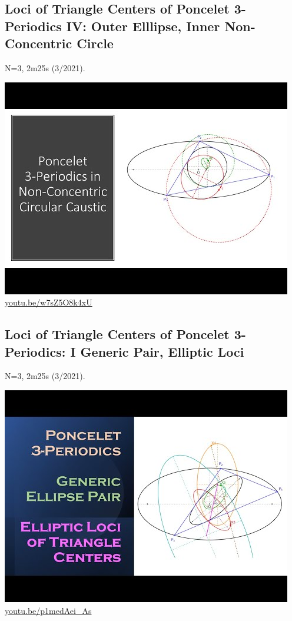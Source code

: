 \documentclass[12pt]{amsart}
\begin{document}
\subsection{Loci of Triangle Centers of Poncelet 3-Periodics IV: Outer Elllipse, Inner Non-Concentric Circle}
\label{vid:w7sZ5O8k4xU}
\noindent N=3, 2m25s (3/2021). 
\begin{center}\includegraphics[width=.5\textwidth]{pics/w7sZ5O8k4xU.jpg} \\ 
\href{https://youtu.be/w7sZ5O8k4xU}{\url{youtu.be/w7sZ5O8k4xU}}\end{center}
% 

\subsection{Loci of Triangle Centers of Poncelet 3-Periodics: 
I Generic Pair, Elliptic Loci}
\label{vid:p1medAei_As}
\noindent N=3, 2m25s (3/2021). 
\begin{center}\includegraphics[width=.5\textwidth]{pics/p1medAei_As.jpg} \\ 
\href{https://youtu.be/p1medAei_As}{\url{youtu.be/p1medAei\_As}}\end{center}
% 
\end{document}
